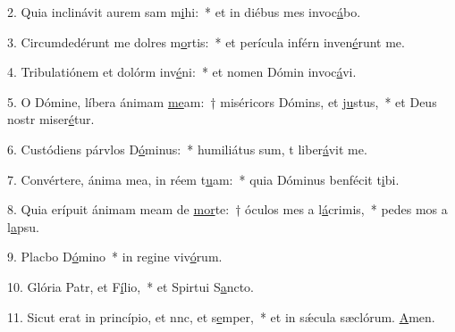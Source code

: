 2. Quia inclinávit aurem sam m\uline{i}hi:~* et in diébus mes invoc\uline{á}bo.\par 
3. Circumdedérunt me dolres m\uline{o}rtis:~* et perícula inférn inven\uline{é}runt me.\par 
4. Tribulatiónem et dolórm inv\uline{é}ni:~* et nomen Dómin invoc\uline{á}vi.\par 
5. O Dómine, líbera ánimam \uline{me}am:~† miséricors Dómins, et j\uline{u}stus,~* et Deus nostr miser\uline{é}tur.\par 
6. Custódiens párvlos D\uline{ó}minus:~* humiliátus sum, t liber\uline{á}vit me.\par 
7. Convértere, ánima mea, in réem t\uline{u}am:~* quia Dóminus benfécit t\uline{i}bi.\par 
8. Quia erípuit ánimam meam de \uline{mor}te:~† óculos mes a l\uline{á}crimis,~* pedes mos a l\uline{a}psu.\par 
9. Placbo D\uline{ó}mino~* in regine viv\uline{ó}rum.\par 
10. Glória Patr, et F\uline{í}lio,~* et Spirtui S\uline{a}ncto.\par 
11. Sicut erat in princípio, et nnc, et s\uline{e}mper,~* et in sǽcula sæclórum. \uline{A}men.\par 
